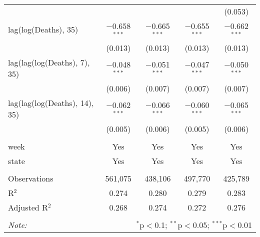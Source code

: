 \begin{tabular}{@{\extracolsep{1pt}}lcccc}
  &  &  &  & (0.053) \\ 
  lag(log(Deaths), 35) & $-$0.658$^{***}$ & $-$0.665$^{***}$ & $-$0.655$^{***}$ & $-$0.662$^{***}$ \\ 
  & (0.013) & (0.013) & (0.013) & (0.013) \\ 
  lag(lag(log(Deaths), 7), 35) & $-$0.048$^{***}$ & $-$0.051$^{***}$ & $-$0.047$^{***}$ & $-$0.050$^{***}$ \\ 
  & (0.006) & (0.007) & (0.007) & (0.007) \\ 
  lag(lag(log(Deaths), 14), 35) & $-$0.062$^{***}$ & $-$0.066$^{***}$ & $-$0.060$^{***}$ & $-$0.065$^{***}$ \\ 
  & (0.005) & (0.006) & (0.005) & (0.006) \\ 
 \hline \\[-1.8ex] 
week & Yes & Yes & Yes & Yes \\ 
state & Yes & Yes & Yes & Yes \\ 
\hline \\[-1.8ex] 
Observations & 561,075 & 438,106 & 497,770 & 425,789 \\ 
R$^{2}$ & 0.274 & 0.280 & 0.279 & 0.283 \\ 
Adjusted R$^{2}$ & 0.268 & 0.274 & 0.272 & 0.276 \\ 
\hline 
\hline \\[-1.8ex] 
\textit{Note:}  & \multicolumn{4}{r}{$^{*}$p$<$0.1; $^{**}$p$<$0.05; $^{***}$p$<$0.01} \\ 
\end{tabular} 